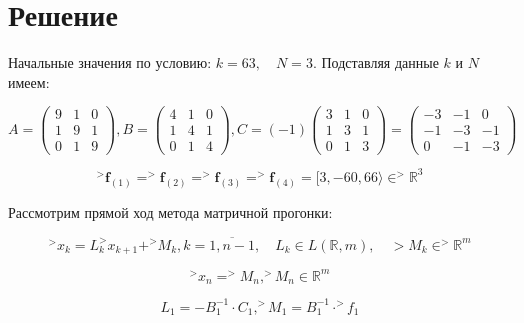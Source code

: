 \documentclass[14pt,a4paper]{scrartcl}
\begin{document}
\pagebreak

\section*{Решение}

Начальные значения по условию: $k = 63, \quad N = 3$. Подставляя данные $k$ и $N$ имеем:

\begin{equation*}
	A=\left(\begin{array}{lll}
	9 & 1 & 0 \\
	1 & 9 & 1 \\
	0 & 1 & 9
	\end{array}\right), B=\left(\begin{array}{lll}
	4 & 1 & 0 \\
	1 & 4 & 1 \\
	0 & 1 & 4
	\end{array}\right), C=(-1)\left(\begin{array}{lll}
	3 & 1 & 0 \\
	1 & 3 & 1 \\
	0 & 1 & 3
	\end{array}\right) = 
	\left(\begin{array}{lll}
	-3 & -1 & 0 \\
	-1 & -3 & -1 \\
	0 & -1 & -3
	\end{array}\right)
\end{equation*}

\begin{equation*}
^>\mathbf{f}_{(1)}= ^>\mathbf{f}_{(2)}= ^>\mathbf{f}_{(3)}= ^>\mathbf{f}_{(4)}=[3, -60, 66\rangle \in ^>\mathbb{R}^{3}
\end{equation*}

Рассмотрим прямой ход метода матричной прогонки:

\begin{equation}\label{3}
	^>x_{k}=L_{k} ^{>}x_{k+1}+^{>}M_{k}, k=\overline{1, n-1}, \quad L_{k} \in L(\mathbb{R}, m), \quad>M_{k} \in^{>} \mathbb{R}^{m}
\end{equation}


\begin{equation*}
	^>x_{n}= ^{>}M_{n}, ^{>}M_{n} \in \mathbb{R}^{m}
\end{equation*}


\begin{equation*}
	L_{1}=-B_{1}^{-1} \cdot C_{1},^{>} M_{1}=B_{1}^{-1} \cdot^{>} f_{1}
\end{equation*}
\end{document}

